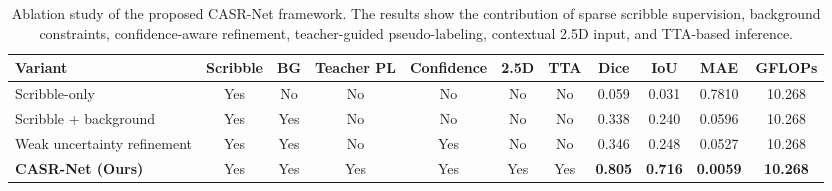 \begin{table}[t]
\centering
\caption{Ablation study of the proposed CASR-Net framework. The results show the contribution of sparse scribble supervision, background constraints, confidence-aware refinement, teacher-guided pseudo-labeling, contextual 2.5D input, and TTA-based inference.}
\label{tab:casrnet_ablation}
\begin{tabular}{lcccccccccc}
\hline
Variant & Scribble & BG & Teacher PL & Confidence & 2.5D & TTA & Dice & IoU & MAE & GFLOPs \\
\hline
Scribble-only & Yes & No & No & No & No & No & 0.059 & 0.031 & 0.7810 & 10.268 \\
Scribble + background & Yes & Yes & No & No & No & No & 0.338 & 0.240 & 0.0596 & 10.268 \\
Weak uncertainty refinement & Yes & Yes & No & Yes & No & No & 0.346 & 0.248 & 0.0527 & 10.268 \\
\textbf{CASR-Net (Ours)} & Yes & Yes & Yes & Yes & Yes & Yes & \textbf{0.805} & \textbf{0.716} & \textbf{0.0059} & \textbf{10.268} \\
\hline
\end{tabular}
\end{table}
